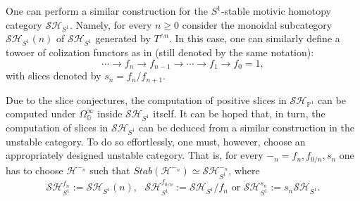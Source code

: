 One can perform a similar construction for the $S^1$-stable motivic homotopy category $\mathcal{SH}_{S^1}$. Namely, for every $n\geq 0$ consider the monoidal subcategory $\mathcal{SH}_{S^1}(n)$ of $\mathcal{SH}_{S^1}$ generated by $T^{\wedge n}$. In this case, one can similarly define a towoer of colization functors as in  (still denoted by the same notation):
$$\cdots\to f_n\to f_{n-1}\to \cdots \to f_1\to f_0=1,$$ with slices denoted by $s_n=f_n/f_{n+1}$.

Due to the slice conjectures, the computation of positive slices in $\mathcal{SH}_{\mathbb{P}^1}$ can be computed under $\Omega^\infty_{\mathbb{G}}$ inside $\mathcal{SH}_{S^1}$ itself. It can be hoped that, in turn, the computation of slices in $\mathcal{SH}_{S^1}$ can be deduced from a similar construction in the unstable category. To do so effortlessly, one must, however, choose an appropriately designed unstable category. That is, for every $-_n=f_n, f_{0/n}, s_n$ one has to choose $\mathcal{H}^{-_n}$ such that $Stab(\mathcal{H}^{-_n})\simeq \mathcal{SH}^{-_n}_{S^1}$, where  $$\mathcal{SH}_{S^1}^{f_n}:=\mathcal{SH}_{S^1}(n),\text{ }\mathcal{SH}_{S^1}^{f_{0/n}}:=\mathcal{SH}_{S^1}/f_n\text{ or } \mathcal{SH}_{S^1}^{s_n}:=s_n\mathcal{SH}_{S^1}.$$ 

